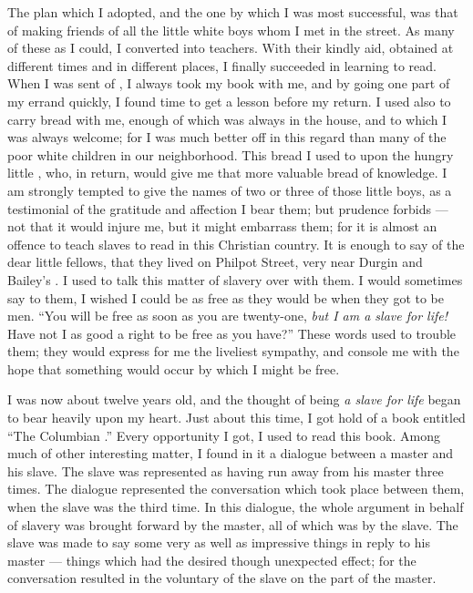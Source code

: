 \documentclass{fiche}
\begin{document}
\begin{texte}
The plan which I adopted, and the one by which I was most successful, was that of making
friends of all the little white boys whom I met in the street. As many of these as I could, I
converted into teachers. With their kindly aid, obtained at different times and in different
places, I finally succeeded in learning to read. When I was sent of
, I always took my book with me, and by
going one part of my errand quickly, I found time to get a lesson before my return. I used
also to carry bread with me, enough of which was always in the house, and to which I was
always welcome; for I was much better off in this regard than many of the poor white children
in our neighborhood. This bread I used to  upon
the hungry little , who, in return,
would give me that more valuable bread of knowledge. I am strongly tempted to give the names
of two or three of those little boys, as a testimonial of the gratitude and affection I bear
them; but prudence forbids --- not that it would injure me, but it might embarrass them; for
it is almost an  offence to teach slaves to
read in this Christian country. It is enough to say of the dear little fellows, that they
lived on Philpot Street, very near Durgin and Bailey's . I used to talk this matter of slavery over with them. I would sometimes say
to them, I wished I could be as free as they would be when they got to be men. ``You will be
free as soon as you are twenty-one, \emph{but I am a slave for life!} Have not I as good a
right to be free as you have?'' These words used to trouble them; they would express for me
the liveliest sympathy, and console me with the hope that something would occur by which I
might be free.

I was now about twelve years old, and the thought of being \emph{a slave for life} began to
bear heavily upon my heart. Just about this time, I got hold of a book entitled ``The
Columbian .'' Every opportunity I got, I used to read this
book. Among much of other interesting matter, I found in it a dialogue between a master and
his slave. The slave was represented as having run away from his master three times. The
dialogue represented the conversation which took place between them, when the slave was
 the third time. In this dialogue, the whole
argument in behalf of slavery was brought forward by the master, all of which was
 by the slave. The slave was made
to say some very  as well as impressive things in reply to his
master --- things which had the desired though unexpected effect; for the conversation
resulted in the voluntary  of the slave on
the part of the master.


\end{texte}
\end{document}
